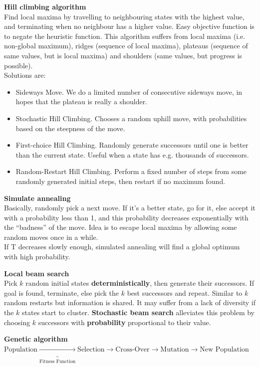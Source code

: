 \documentclass[10pt,landscape]{article}
\begin{document}
\begin{multicols}{3}
\begin{scriptsize}
\textbf{Hill climbing algorithm}\\
Find local maxima by travelling to neighbouring states with
 the highest value, and terminating when no neighbour has
 a higher value. Easy objective function is to negate the
 heuristic function.
 This algorithm suffers from local maxima (i.e. non-global
 maximum), ridges (sequence of local maxima), plateaus
 (sequence of same values, but is local maxima) and shoulders (same values, but progress is possible). 
 \\Solutions are:
 \begin{itemize}
  \item Sideways Move. We do a limited number of consecutive sideways move, in hopes that the plateau is really a
  shoulder.
  \item Stochastic Hill Climbing. Chooses a random uphill
  move, with probabilities based on the steepness of the
  move.
  \item First-choice Hill Climbing. Randomly generate successors until one is better than the current state. Useful
  when a state has e.g. thousands of successors.
  \item Random-Restart Hill Climbing. Perform a fixed
  number of steps from some randomly generated initial
  steps, then restart if no maximum found.
 \end{itemize}

 \textbf{Simulate annealing}\\
 Basically, randomly pick a next move. If it's a better state,
 go for it, else accept it with a probability less than 1, and
 this probability decreases exponentially with the “badness”
 of the move. Idea is to escape local maxima by allowing
 some random moves once in a while. \\
 If T decreases slowly enough, simulated annealing will find a global optimum with high probability.

 \textbf{Local beam search}\\
 Pick $k$ random initial states \textbf{deterministically}, then generate their successors.
 If goal is found, terminate, else pick the $k$ best successors
 and repeat. Similar to $k$ random restarts but information
 is shared. It may suffer from a lack of diversity if the $k$
 states start to cluster. \textbf{Stochastic beam search} alleviates this problem by choosing $k$ successors with \textbf{probability}
 proportional to their value.

\textbf{Genetic algorithm}\\
$\text{Population} \underbrace{\rightarrow}_{\text{Fitness Function}} \text{Selection} \rightarrow \text{Cross-Over} \rightarrow \text{Mutation} \rightarrow \text{New Population}$


\end{scriptsize}
\end{multicols}
\end{document}
